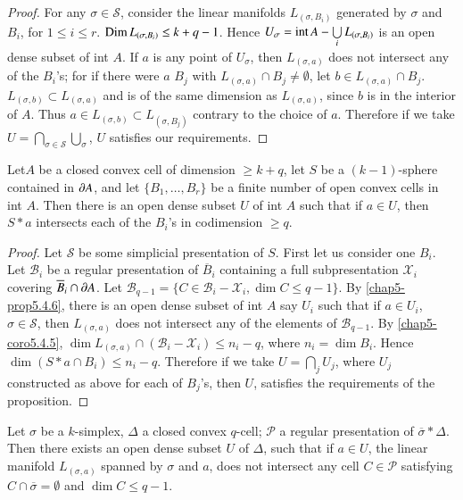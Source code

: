 \begin{proof}
For any $\sigma\in\mathscr{S}$, consider the linear manifolds $L_{(\sigma,B_{i})}$ generated by $\sigma$ and $B_{i}$, for $1\leq i\leq r$. $\operatorname{Dim} L_{(\sigma,B_{i})}\leq k+q-1$. Hence $U_{\sigma}=\text{int\,}A-\bigcup\limits_{i}L_{(\sigma,B_{i})}$ is an open dense subset of int $A$. If $a$ is any point of $U_{\sigma}$, then $L_{(\sigma,a)}$ does not intersect any of the $B_{i}$'s; for if there were $a$ $B_{j}$ with $L_{(\sigma,a)}\cap B_{j}\neq \emptyset$, let $b\in L_{(\sigma,a)}\cap B_{j}$. $L_{(\sigma,b)}\subset L_{(\sigma,a)}$ and is of the same dimension as $L_{(\sigma,a)}$, since $b$ is in the interior of $A$. Thus $a\in L_{(\sigma,b)}\subset L_{(\sigma,B_{j})}$ contrary to the choice of $a$. Therefore if we take $U=\bigcap\limits_{\sigma\in\mathscr{S}}\bigcup_{\sigma}$, $U$ satisfies our requirements.
\end{proof}

\begin{proposition}\label{chap5-prop5.4.7}
Let\pageoriginale $A$ be a closed convex cell of dimension $\geq k+q$, let $S$ be a $(k-1)$-sphere contained in $\partial A$, and let $\{B_{1},\ldots,B_{r}\}$ be a finite number of open convex cells in int $A$. Then there is an open dense subset $U$ of int $A$ such that if $a\in U$, then $S\ast a$ intersects each of the $B_{i}$'s in codimension $\geq q$.
\end{proposition}

\begin{proof}
Let $\mathscr{S}$ be some simplicial presentation of $S$. First let us consider one $B_{i}$. Let $\mathscr{B}_{i}$ be a regular presentation of $\overline{B}_{i}$ containing a full subpresentation $\mathscr{X}_{i}$ covering $\overline{B}_{i}\cap \partial A$. Let $\mathscr{B}_{q-1}=\{C\in\mathscr{B}_{i}-\mathscr{X}_{i},\dim C\leq q-1\}$. By \ref{chap5-prop5.4.6}, there is an open dense subset of int $A$ say $U_{i}$ such that if $a\in U_{i}$, $\sigma\in \mathscr{S}$, then $L_{(\sigma,a)}$ does not intersect any of the elements of $\mathscr{B}_{q-1}$. By \ref{chap5-coro5.4.5}, $\dim L_{(\sigma,a)}\cap (\mathscr{B}_{i}-\mathscr{X}_{i})\leq n_{i}-q$, where $n_{i}=\dim B_{i}$. Hence $\dim (S\ast a\cap B_{i})\leq n_{i}-q$. Therefore if we take $U=\bigcap_{j}U_{j}$, where $U_{j}$ constructed as above for each of $B_{j}$'s, then $U$, satisfies the requirements of the proposition.
\end{proof}

\begin{proposition}\label{chap5-prop5.4.8}
Let $\sigma$ be a $k$-simplex, $\Delta$ a closed convex $q$-cell; $\mathscr{P}$ a regular presentation of $\overline{\sigma}\ast\Delta$. Then there exists an open dense subset $U$ of $\Delta$, such that if $a\in U$, the linear manifold $L_{(\sigma,a)}$ spanned by $\sigma$ and $a$, does not intersect any cell $C\in \mathscr{P}$ satisfying $C\cap \overline{\sigma}=\emptyset$ and $\dim C\leq q-1$. 
\end{proposition}

